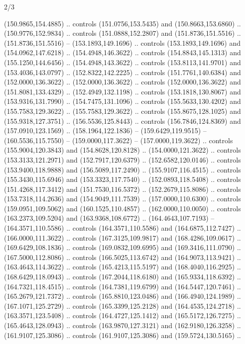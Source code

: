 \begin{flagdescription}{2/3}
\begin{scope}[shift={(0.5\flaglength,0.5)},scale=\flagwidth/320]
\begin{scope}[y=0.8pt, x=0.8pt, yscale=-1,shift={(-300,-200)}]
{\begin{scope}[line width=0.0011\flagwidth]
  (150.9865,154.4885) .. controls (151.0756,153.5435) and (150.8663,153.6860) ..
  (150.9776,152.9834) .. controls (151.0888,152.2807) and (151.8736,151.5516) ..
  (151.8736,151.5516) -- (153.1893,149.1696) .. controls (153.1893,149.1696) and
  (154.0962,147.6218) .. (154.4948,146.3622) .. controls (154.8843,145.1313) and
  (155.1250,144.6456) .. (154.4948,143.3622) .. controls (153.8113,141.9701) and
  (153.4036,143.0797) .. (152.8322,142.2225) .. controls (151.7761,140.6384) and
  (152.0000,136.3622) .. (152.0000,136.3622) .. controls (152.0000,136.3622) and
  (151.8081,133.4329) .. (152.4949,132.1198) .. controls (153.1818,130.8067) and
  (153.9316,131.7990) .. (154.7475,131.1096) .. controls (155.5633,130.4202) and
  (155.7583,129.3622) .. (155.7583,129.3622) .. controls (155.8675,128.1025) and
  (155.9318,127.3751) .. (156.5536,125.8443) .. controls (156.7846,124.8369) and
  (157.0910,123.1569) .. (158.1964,122.1836) -- (159.6429,119.9515) --
  (160.5536,115.7550) -- (159.0000,117.3622) -- (157.0000,119.3622) .. controls
  (155.9004,120.3843) and (154.8628,120.8128) .. (154.0000,121.3622) .. controls
  (153.3133,121.2971) and (152.7917,120.6379) .. (152.6582,120.0146) .. controls
  (153.9400,118.9888) and (156.5089,117.2490) .. (155.9107,116.4515) .. controls
  (155.3430,115.6946) and (153.3323,117.7540) .. (152.0893,118.5408) .. controls
  (151.4268,117.3412) and (151.7530,116.5372) .. (152.2679,115.8086) .. controls
  (153.7318,114.2636) and (154.9049,111.7539) .. (157.0000,110.6300) .. controls
  (159.0951,109.5062) and (160.1525,110.4857) .. (162.0000,110.0050) .. controls
  (163.2373,109.5204) and (163.9368,108.6772) .. (164.4643,107.7193) --
  (164.3571,110.5586) .. controls (164.3571,110.5586) and (164.6875,112.7427) ..
  (166.0000,111.3622) .. controls (167.3125,109.9817) and (168.4286,109.0617) ..
  (169.6429,108.1836) .. controls (169.0832,109.6995) and (169.3416,111.0790) ..
  (167.5000,112.8086) .. controls (166.5025,113.6742) and (164.9073,113.9421) ..
  (163.4643,114.3622) .. controls (165.4213,115.5197) and (168.4040,116.2925) ..
  (168.6429,118.0943) .. controls (167.2044,118.6180) and (165.9334,118.6392) ..
  (164.7321,118.4515) .. controls (164.7381,119.6799) and (164.5447,120.7461) ..
  (165.2679,121.7372) .. controls (165.8810,123.0486) and (166.4940,124.1989) ..
  (167.1071,125.2729) .. controls (165.3399,125.2128) and (164.4535,124.2718) ..
  (163.3571,123.5408) .. controls (164.4727,125.1412) and (165.5172,126.7275) ..
  (165.4643,128.0943) .. controls (163.9870,127.3121) and (162.9180,126.3258) ..
  (161.9107,125.3086) .. controls (161.9107,125.3086) and (159.5724,130.5165) ..

\end{scope}}
\end{scope}
\end{scope}
\end{flagdescription}
